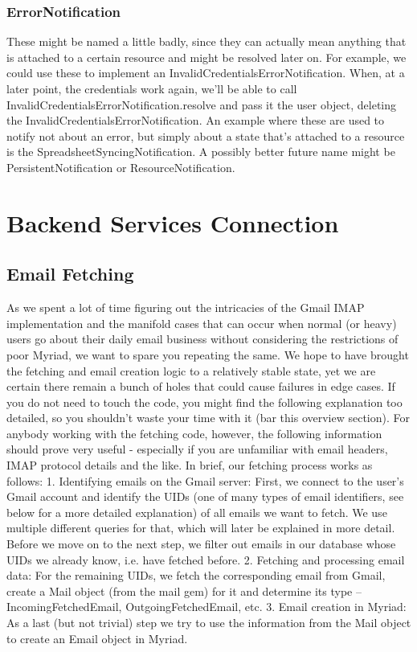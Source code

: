 \subsubsection{ErrorNotification}

These might be named a little badly, since they can actually mean anything that is attached to a certain resource and might be resolved later on. For example, we could use these to implement an InvalidCredentialsErrorNotification. When, at a later point, the credentials work again, we’ll be able to call InvalidCredentialsErrorNotification.resolve and pass it the user object, deleting the InvalidCredentialsErrorNotification.
An example where these are used to notify not about an error, but simply about a state that’s attached to a resource is the SpreadsheetSyncingNotification.
A possibly better future name might be PersistentNotification or ResourceNotification.


\section{Backend Services Connection}



\subsection{Email Fetching}

As we spent a lot of time figuring out the intricacies of the Gmail IMAP implementation and the manifold cases that can occur when normal (or heavy) users go about their daily email business without considering the restrictions of poor Myriad, we want to spare you repeating the same. We hope to have brought the fetching and email creation logic to a relatively stable state, yet we are certain there remain a bunch of holes that could cause failures in edge cases.
If you do not need to touch the code, you might find the following explanation too detailed, so you shouldn't waste your time with it (bar this overview section). For anybody working with the fetching code, however, the following information should prove very useful - especially if you are unfamiliar with email headers, IMAP protocol details and the like.
In brief, our fetching process works as follows:
1.	Identifying emails on the Gmail server: First, we connect to the user's Gmail account and identify the UIDs (one of many types of email identifiers, see below for a more detailed explanation) of all emails we want to fetch. We use multiple different queries for that, which will later be explained in more detail. Before we move on to the next step, we filter out emails in our database whose UIDs we already know, i.e. have fetched before.
2.	Fetching and processing email data: For the remaining UIDs, we fetch the corresponding email from Gmail, create a Mail object (from the mail gem) for it and determine its type – IncomingFetchedEmail, OutgoingFetchedEmail, etc.
3.	Email creation in Myriad: As a last (but not trivial) step we try to use the information from the Mail object to create an Email object in Myriad.

